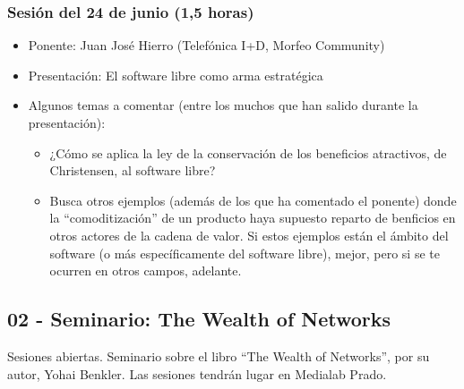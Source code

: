 \documentclass[a4paper,12pt]{article}
\begin{document}


\subsubsection{Sesión del 24 de junio (1,5 horas)}

\begin{itemize}
\item Ponente: Juan José Hierro (Telefónica I+D, Morfeo Community)
\item Presentación: El software libre como arma estratégica
\item Algunos temas a comentar (entre los muchos que han salido durante la presentación): 
  \begin{itemize}
  \item ¿Cómo se aplica la ley de la conservación de los beneficios atractivos, de Christensen, al software libre?
  \item Busca otros ejemplos (además de los que ha comentado el ponente) donde la ``comoditización'' de un producto haya supuesto reparto de benficios en otros actores de la cadena de valor. Si estos ejemplos están el ámbito del software (o más específicamente del software libre), mejor, pero si se te ocurren en otros campos, adelante.
  \end{itemize}
\end{itemize}

\subsection{02 - Seminario: The Wealth of Networks}

Sesiones abiertas. Seminario sobre el libro ``The Wealth of Networks'', por su autor, Yohai Benkler. Las sesiones tendrán lugar en Medialab Prado.
\end{document}
